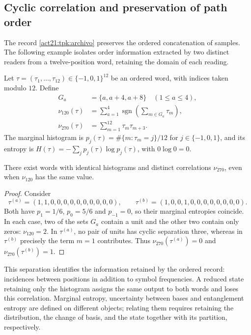 \subsection{Cyclic correlation and preservation of path order}
\label{sec:rec27-memoria}

The record \eqref{act21:tpk:archivo} preserves the ordered
concatenation of samples. The following example isolates order
information extracted by two distinct readers from a twelve-position
word, retaining the domain of each reading.

Let $\tau=(\tau_1,\ldots,\tau_{12})\in\{-1,0,1\}^{12}$ be an ordered
word, with indices taken modulo $12$. Define
\[
\begin{aligned}
 G_a&=\{a,a+4,a+8\}\quad(1\leq a\leq4),\\
 \nu_{120}(\tau)&=\sum_{a=1}^4\operatorname{sgn}
 \left(\sum_{m\in G_a}\tau_m\right),\\
 \nu_{270}(\tau)&=\sum_{m=1}^{12}\tau_m\tau_{m+3}.
\end{aligned}
\]
The marginal histogram is $p_j(\tau)=\#\{m:\tau_m=j\}/12$ for
$j\in\{-1,0,1\}$, and its entropy is
$H(\tau)=-\sum_j p_j(\tau)\log p_j(\tau)$, with $0\log0=0$.

\begin{proposition}
There exist words with identical histograms and distinct correlations
$\nu_{270}$, even when $\nu_{120}$ has the same value.
\end{proposition}
\begin{proof}
Consider
\[
 \tau^{(a)}=(1,1,0,0,0,0,0,0,0,0,0,0),\qquad
 \tau^{(b)}=(1,0,0,1,0,0,0,0,0,0,0,0).
\]
Both have $p_1=1/6$, $p_0=5/6$ and $p_{-1}=0$, so their marginal
entropies coincide. In each case, two of the sets $G_a$ contain a unit and
the other two contain only zeros: $\nu_{120}=2$.
In $\tau^{(a)}$, no pair of units has cyclic separation three, whereas in
$\tau^{(b)}$ precisely the term $m=1$ contributes.
Thus $\nu_{270}(\tau^{(a)})=0$ and $\nu_{270}(\tau^{(b)})=1$.
\end{proof}

This separation identifies the information retained by the ordered record:
incidences between positions in addition to symbol frequencies.
A reduced state retaining only the histogram assigns the same output to
both words and loses this correlation. Marginal entropy, uncertainty
between bases and entanglement entropy are defined on different objects;
relating them requires retaining the distribution, the change of basis,
and the state together with its partition, respectively.
